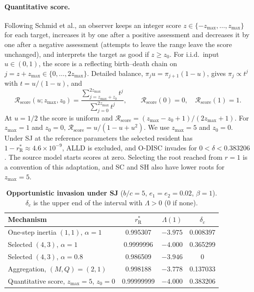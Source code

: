 \documentclass[fleqn,10pt]{wlscirep}
\newcommand{\Rmap}{\mathscr{R}}            %
\newcommand{\rR}{r_{\mathrm{R}}^{*}}
\theoremstyle{plain}
\begin{document}
\paragraph{Quantitative score.} Following Schmid et al., an observer keeps an integer score $z\in\{-z_{\max},\ldots,z_{\max}\}$ for each target, increases it by one after a positive assessment and decreases it by one after a negative assessment (attempts to leave the range leave the score unchanged), and interprets the target as good if $z\geq z_0$. For i.i.d.\ input $u\in(0,1)$, the score is a reflecting birth--death chain on $j=z+z_{\max}\in\{0,\ldots,2z_{\max}\}$. Detailed balance, $\pi_ju=\pi_{j+1}(1-u)$, gives $\pi_j\propto t^j$ with $t=u/(1-u)$, and
\begin{equation}
\Rmap_{\mathrm{score}}(u;z_{\max},z_0)=\frac{\sum_{j=z_{\max}+z_0}^{2z_{\max}}t^j}{\sum_{j=0}^{2z_{\max}}t^j},\qquad \Rmap_{\mathrm{score}}(0)=0,\quad \Rmap_{\mathrm{score}}(1)=1.
\label{eq:s-score}
\end{equation}
At $u=1/2$ the score is uniform and $\Rmap_{\mathrm{score}}=(z_{\max}-z_0+1)/(2z_{\max}+1)$. For $z_{\max}=1$ and $z_0=0$, $\Rmap_{\mathrm{score}}=u/(1-u+u^2)$. We use $z_{\max}=5$ and $z_0=0$. Under SJ at the reference parameters the selected resident has $1-\rR\approx4.6\times10^{-9}$, ALLD is excluded, and O-DISC invades for $0<\delta<0.383206$. The source model starts scores at zero. Selecting the root reached from $r=1$ is a convention of this adaptation, and SC and SH also have lower roots for $z_{\max}=5$.

\begin{table}[!htbp]
\centering
\caption{\textbf{Opportunistic invasion under SJ} ($b/c=5$, $e_1=e_2=0.02$, $\beta=1$). $\delta_c$ is the upper end of the interval with $\Lambda>0$ (0 if none).}
\label{tab:si-filters}
\small
\begin{tabular}{@{}lccc@{}}
\toprule
Mechanism & $\rR$ & $\Lambda(1)$ & $\delta_c$\\
\midrule
One-step inertia $(1,1)$, $\alpha=1$ & 0.995307 & $-3.975$ & 0.008397\\
Selected $(4,3)$, $\alpha=1$ & 0.9999996 & $-4.000$ & 0.365299\\
Selected $(4,3)$, $\alpha=0.8$ & 0.986509 & $-3.946$ & 0\\
Aggregation, $(M,Q)=(2,1)$ & 0.998188 & $-3.778$ & 0.137033\\
Quantitative score, $z_{\max}=5$, $z_0=0$ & 0.99999999 & $-4.000$ & 0.383206\\
\bottomrule
\end{tabular}
\end{table}
\end{document}
